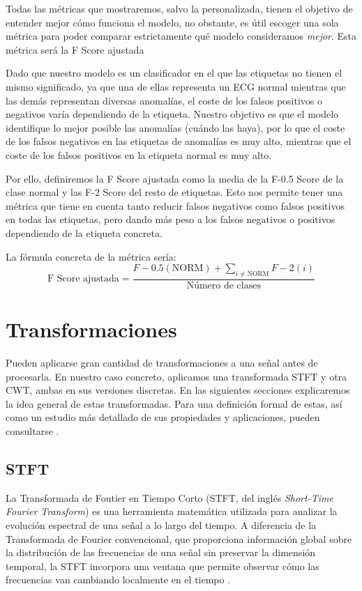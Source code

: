 Todas las métricas que mostraremos, salvo la personalizada, tienen el objetivo de entender mejor cómo funciona el modelo, no obstante, es útil escoger una sola métrica para poder comparar estrictamente qué modelo consideramos \emph{mejor}. Esta métrica será la F Score ajustada 

Dado que nuestro modelo es un clasificador en el que las etiquetas no tienen el mismo significado, ya que una de ellas representa un ECG normal mientras que las demás representan diversas anomalías, el coste de los falsos positivos o negativos varía dependiendo de la etiqueta. Nuestro objetivo es que el modelo identifique lo mejor posible las anomalías (cuándo las haya), por lo que el coste de los falsos negativos en las etiquetas de anomalías es muy alto, mientras que el coste de los falsos positivos en la etiqueta normal es muy alto.

Por ello, definiremos la F Score ajustada como la media de la F-0.5 Score de la clase normal y las  F-2 Score del resto de etiquetas. Esto nos permite tener una métrica que tiene en cuenta tanto reducir falsos negativos como falsos positivos en todas las etiquetas, pero dando más peso a los falsos negativos o positivos dependiendo de la etiqueta concreta.

La fórmula concreta de la métrica sería:
\begin{equation*}
	\text{F Score ajustada} = \frac{F-0.5(\text{NORM}) + \sum_{i \neq \text{NORM}}F-2(i)}{\text{Número de clases}}
\end{equation*}


\section{Transformaciones}

Pueden aplicarse gran cantidad de transformaciones a una señal antes de procesarla. En nuestro caso concreto, aplicamos una transformada STFT y otra CWT, ambas en sus versiones discretas. En las siguientes secciones explicaremos la idea general de estas transformadas. Para una definición formal de estas, así como un estudio más detallado de sus propiedades y aplicaciones, pueden consultarse \cite{Oppenheim2009, Allen1977}.

\subsection{STFT}
\label{subsec:stft}

La Transformada de Foutier en Tiempo Corto (STFT, del inglés \emph{Short-Time Fourier Transform}) es una herramienta matemática utilizada para analizar la evolución espectral de una señal a lo largo del tiempo. A diferencia de la Transformada de Fourier convencional, que proporciona información global sobre la distribución de las frecuencias de una señal sin preservar la dimensión temporal, la STFT incorpora una ventana que permite observar cómo las frecuencias van cambiando localmente en el tiempo \citep{Allen1977, Oppenheim2009}.

